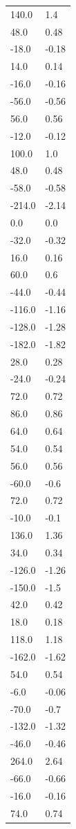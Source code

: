 \begin{longtable}{ll}
140.0 & 1.4 \\
48.0 & 0.48 \\
-18.0 & -0.18 \\
14.0 & 0.14 \\
-16.0 & -0.16 \\
-56.0 & -0.56 \\
56.0 & 0.56 \\
-12.0 & -0.12 \\
100.0 & 1.0 \\
48.0 & 0.48 \\
-58.0 & -0.58 \\
-214.0 & -2.14 \\
0.0 & 0.0 \\
-32.0 & -0.32 \\
16.0 & 0.16 \\
60.0 & 0.6 \\
-44.0 & -0.44 \\
-116.0 & -1.16 \\
-128.0 & -1.28 \\
-182.0 & -1.82 \\
28.0 & 0.28 \\
-24.0 & -0.24 \\
72.0 & 0.72 \\
86.0 & 0.86 \\
64.0 & 0.64 \\
54.0 & 0.54 \\
56.0 & 0.56 \\
-60.0 & -0.6 \\
72.0 & 0.72 \\
-10.0 & -0.1 \\
136.0 & 1.36 \\
34.0 & 0.34 \\
-126.0 & -1.26 \\
-150.0 & -1.5 \\
42.0 & 0.42 \\
18.0 & 0.18 \\
118.0 & 1.18 \\
-162.0 & -1.62 \\
54.0 & 0.54 \\
-6.0 & -0.06 \\
-70.0 & -0.7 \\
-132.0 & -1.32 \\
-46.0 & -0.46 \\
264.0 & 2.64 \\
-66.0 & -0.66 \\
-16.0 & -0.16 \\
74.0 & 0.74 \\

\end{longtable}
